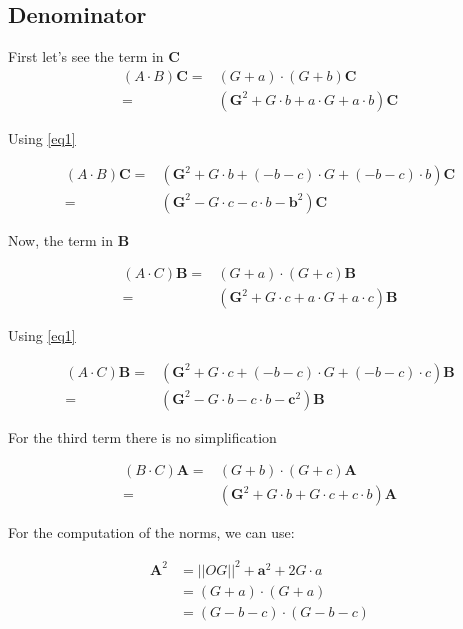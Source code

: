 \documentclass[10pt,a4paper]{article}
\begin{document}
\subsection{Denominator}


First let's see the term in $\mathbf{C}$
\begin{align*}
 \left({A}\cdot {B}\right)\mathbf{C}
	=& \left( G + a \right) \cdot \left( G + b \right) \mathbf{C} \\
	 =& (\mathbf{G}^2 +  G \cdot b	+ a \cdot G + a \cdot b    ) \mathbf{C}
\end{align*}

Using \eqref{eq1}

\begin{align}
 \left({A}\cdot {B}\right)\mathbf{C}
	 =& (\mathbf{G}^2 +  G \cdot b	+ (-b - c) \cdot G + (-b - c) \cdot b    ) \mathbf{C} \nonumber \\
	 =& (\mathbf{G}^2 - G \cdot c - c \cdot b -\mathbf{b}^2)\mathbf{C}
\end{align}



Now, the term in $\mathbf{B}$


\begin{align*}
 \left({A}\cdot {C}\right)\mathbf{B} 
	=& \left( G + a \right) \cdot \left( G + c \right) \mathbf{B} \\
	 =& (\mathbf{G}^2 +  G \cdot c	+ a \cdot G + a \cdot c    ) \mathbf{B}
\end{align*}

Using \eqref{eq1}

\begin{align}
 \left({A}\cdot {C}\right)\mathbf{B}
	 =& (\mathbf{G}^2 +  G \cdot c	+ (-b - c) \cdot G + (-b - c) \cdot c    ) \mathbf{B} \nonumber \\
	 =& (\mathbf{G}^2 - G \cdot b - c \cdot b - \mathbf{c}^2)\mathbf{B}
\end{align}


For the third term there is no simplification

\begin{align}
 \left({B}\cdot {C}\right)\mathbf{A}
	=& \left( G + b \right) \cdot \left( G + c \right) \mathbf{A}\\
	=& (\mathbf{G}^2 + G \cdot b + G \cdot c + c \cdot b)\mathbf{A}
\end{align}


For the computation of the norms, we can use:

\begin{align*}
\mathbf{A}^2 &= ||OG||^2 + \mathbf{a}^2 + 2 G \cdot a \\
        &=   (G+a) \cdot (G+a) \\
        &=   (G-b-c) \cdot (G-b-c) \\
\end{align*}
\end{document}
